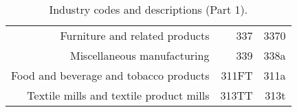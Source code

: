 \begin{table}[H]
\begin{center}
\begin{tabular}{rrr}
Furniture and related products                                       & 337         & 3370      \\%
Miscellaneous manufacturing                                          & 339         & 338a      \\%
Food and beverage and tobacco products                               & 311FT       & 311a      \\%
Textile mills and textile product mills                              & 313TT       & 313t      \\%
\hline\hline
\end{tabular}
\end{center}
\caption{\label{tab:industries_1}Industry codes and descriptions (Part 1).}
\end{table}


